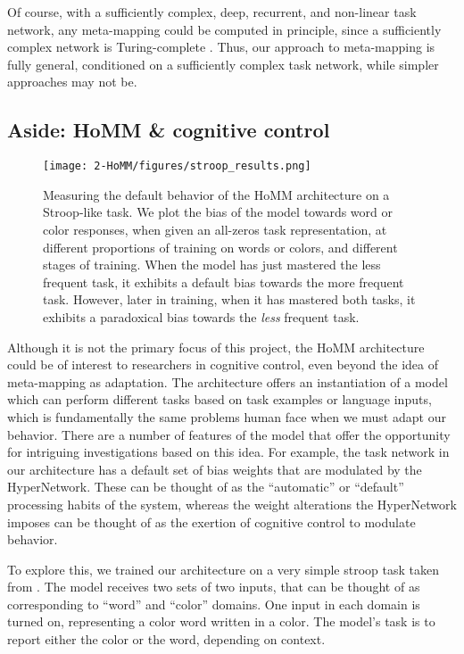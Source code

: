 Of course, with a sufficiently complex, deep, recurrent, and non-linear task network, any meta-mapping could be computed in principle, since a sufficiently complex network is Turing-complete \citep{Siegelman1992}. Thus, our approach to meta-mapping is fully general, conditioned on a sufficiently complex task network, while simpler approaches may not be.



\subsection{Aside: HoMM \& cognitive control}
\begin{figure}
\centering
\texttt{[image: 2-HoMM/figures/stroop\_results.png]}
\caption[Measuring the default behavior of the HoMM architecture on a Stroop-like task.]{Measuring the default behavior of the HoMM architecture on a Stroop-like task. We plot the bias of the model towards word or color responses, when given an all-zeros task representation, at different proportions of training on words or colors, and different stages of training. When the model has just mastered the less frequent task, it exhibits a default bias towards the more frequent task. However, later in training, when it has mastered both tasks, it exhibits a paradoxical bias towards the \emph{less} frequent task.} \label{supp_fig:HoMM_cognitive_control}
\end{figure}

Although it is not the primary focus of this project, the HoMM architecture could be of interest to researchers in cognitive control, even beyond the idea of meta-mapping as adaptation. The architecture offers an instantiation of a model which can perform different tasks based on task examples or language inputs, which is fundamentally the same problems human face when we must adapt our behavior. There are a number of features of the model that offer the opportunity for intriguing investigations based on this idea. For example, the task network in our architecture has a default set of bias weights that are modulated by the HyperNetwork. These can be thought of as the ``automatic'' or ``default'' processing habits of the system, whereas the weight alterations the HyperNetwork imposes can be thought of as the exertion of cognitive control to modulate behavior. 

To explore this, we trained our architecture on a very simple stroop task taken from \citet{Cohen1990}. The model receives two sets of two inputs, that can be thought of as corresponding to ``word'' and ``color'' domains. One input in each domain is turned on, representing a color word written in a color. The model's task is to report either the color or the word, depending on context.

